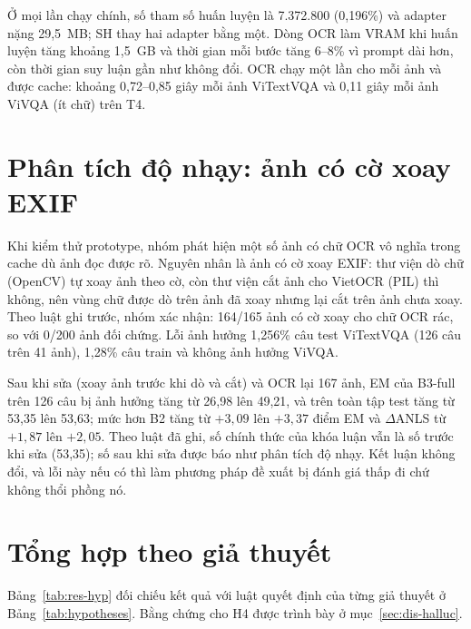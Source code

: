 Ở mọi lần chạy chính, số tham số huấn luyện là 7.372.800 (0,196\%) và adapter nặng
29,5~MB; SH thay hai adapter bằng một. Dòng OCR làm VRAM khi huấn luyện tăng
khoảng 1,5~GB và thời gian mỗi bước tăng 6--8\% vì prompt dài hơn, còn thời gian
suy luận gần như không đổi. OCR chạy một lần cho mỗi ảnh và được cache: khoảng
0,72--0,85 giây mỗi ảnh ViTextVQA và 0,11 giây mỗi ảnh ViVQA (ít chữ) trên T4.

\section{Phân tích độ nhạy: ảnh có cờ xoay EXIF}
\label{sec:res-exif}

Khi kiểm thử prototype, nhóm phát hiện một số ảnh có chữ OCR vô nghĩa trong cache
dù ảnh đọc được rõ. Nguyên nhân là ảnh có cờ xoay EXIF: thư viện dò chữ (OpenCV)
tự xoay ảnh theo cờ, còn thư viện cắt ảnh cho VietOCR (PIL) thì không, nên vùng
chữ được dò trên ảnh đã xoay nhưng lại cắt trên ảnh chưa xoay. Theo luật ghi
trước, nhóm xác nhận: 164/165 ảnh có cờ xoay cho chữ OCR rác, so với 0/200 ảnh đối
chứng. Lỗi ảnh hưởng 1,256\% câu test ViTextVQA (126 câu trên 41 ảnh), 1,28\% câu
train và không ảnh hưởng ViVQA.

Sau khi sửa (xoay ảnh trước khi dò và cắt) và OCR lại 167 ảnh, EM của B3-full
trên 126 câu bị ảnh hưởng tăng từ 26,98 lên 49,21, và trên toàn tập test tăng từ
53,35 lên 53,63; mức hơn B2 tăng từ $+3{,}09$ lên $+3{,}37$ điểm EM và
$\Delta$ANLS từ $+1{,}87$ lên $+2{,}05$. Theo luật đã ghi, số chính thức của
khóa luận vẫn là số trước khi sửa (53,35); số sau khi sửa được báo như phân tích
độ nhạy. Kết luận không đổi, và lỗi này nếu có thì làm phương pháp đề xuất bị đánh
giá thấp đi chứ không thổi phồng nó.

\section{Tổng hợp theo giả thuyết}
\label{sec:res-hyp}

Bảng~\ref{tab:res-hyp} đối chiếu kết quả với luật quyết định của từng giả thuyết
ở Bảng~\ref{tab:hypotheses}. Bằng chứng cho H4 được trình bày ở
mục~\ref{sec:dis-halluc}.

